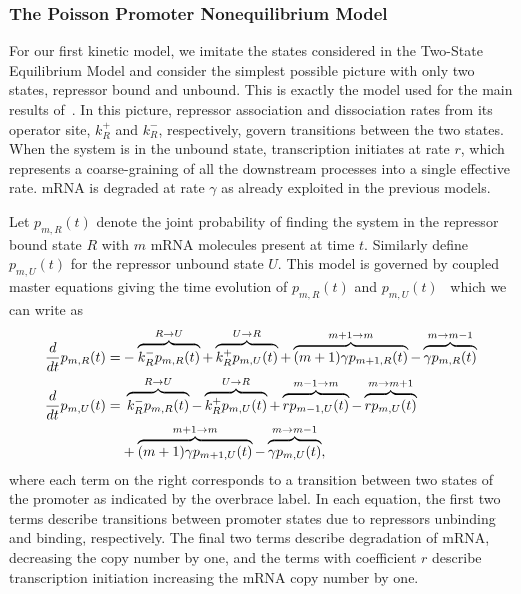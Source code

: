 \subsubsection{The Poisson Promoter Nonequilibrium Model}
For our first kinetic model, we  imitate the states considered in the Two-State
Equilibrium Model and consider the simplest possible picture with only two
states, repressor bound and unbound. This is exactly the model used for the main
results of~\cite{Jones2014}. In this picture, repressor association and
dissociation rates from its operator site, $k_R^+$ and $k_R^-$, respectively,
govern transitions between the two states. When the system is in the unbound
state, transcription initiates at rate $r$, which represents a coarse-graining
of all the downstream processes into a single effective rate. mRNA is degraded
at rate $\gamma$ as already exploited in the previous models.

Let $p_{m,R}(t)$ denote the joint probability of finding the system in the
repressor bound state $R$ with $m$ mRNA molecules present at time $t$. Similarly
define $p_{m,U}(t)$ for the repressor unbound state $U$. This model is governed
by coupled master equations giving the time evolution of $p_{m,R}(t)$ and
$p_{m,U}(t)$~\cite{Sanchez2008, Sanchez2011, Phillips2019} which we can write as
\begin{align}
\begin{split}
\frac{d {}}{d t}p_{m,R}(t) =& 
- \overbrace{k_R^- p_{m,R}(t)}^{R \rightarrow U}
+ \overbrace{k_R^+ p_{m,U}(t)}^{U \rightarrow R}
+ \overbrace{(m+1)\gamma p_{m+1,R}(t)}^{m + 1 \rightarrow m}
- \overbrace{\gamma p_{m,R}(t)}^{m \rightarrow m - 1}
\\
\frac{d {}}{d t}p_{m,U}(t) =&\; 
\overbrace{k_R^- p_{m,R}(t)}^{R \rightarrow U}
- \overbrace{k_R^+ p_{m,U}(t)}^{U \rightarrow R}
+ \overbrace{rp_{m-1,U}(t)}^{m-1 \rightarrow m}
- \overbrace{rp_{m,U}(t)}^{m \rightarrow m + 1}
\\
&+ \overbrace{(m+1)\gamma p_{m+1,U}(t)}^{m + 1 \rightarrow m}
- \overbrace{\gamma p_{m,U}(t)}^{m \rightarrow m - 1},
\label{eq:poisson_promoter_cme}
\end{split}
\end{align}
where each term on the right corresponds to a transition between two states of
the promoter as indicated by the overbrace label. In each equation, the first
two terms describe transitions between promoter states due to repressors
unbinding and binding, respectively. The final two terms describe degradation of
mRNA, decreasing the copy number by one, and the terms with coefficient $r$
describe transcription initiation increasing the mRNA copy number by one.

